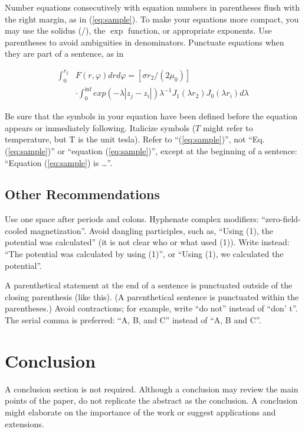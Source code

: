 \documentclass{ifacconf}
\begin{document}
Number equations consecutively with equation numbers in parentheses
flush with the right margin, as in (\ref{eq:sample}).  To make your equations more
compact, you may use the solidus ($/$), the $\exp$ function, or
appropriate exponents. Use parentheses to avoid ambiguities in
denominators. Punctuate equations when they are part of a sentence, as
in

\begin{equation} \label{eq:sample2}
\begin{array}{ll}
\int_0^{r_2} & F (r, \varphi ) dr d\varphi = [\sigma r_2 / (2 \mu_0 )] \\
& \cdot \int_0^{\inf} exp(-\lambda |z_j - z_i |) \lambda^{-1} J_1 (\lambda  r_2 ) J_0 (\lambda r_i ) d\lambda 
\end{array}
\end{equation}

Be sure that the symbols in your equation have been defined before the
equation appears or immediately following. Italicize symbols ($T$
might refer to temperature, but T is the unit tesla). Refer to
``(\ref{eq:sample})'', not ``Eq. (\ref{eq:sample})'' or ``equation
(\ref{eq:sample})'', except at the beginning of a sentence: ``Equation
(\ref{eq:sample}) is \ldots''.

\subsection{Other Recommendations}

Use one space after periods and colons. Hyphenate complex modifiers:
``zero-field-cooled magnetization''. Avoid dangling participles, such
as, ``Using (1), the potential was calculated'' (it is not clear who or
what used (1)). Write instead: ``The potential was calculated by using
(1)'', or ``Using (1), we calculated the potential''.

A parenthetical statement at the end of a sentence is punctuated
outside of the closing parenthesis (like this). (A parenthetical
sentence is punctuated within the parentheses.) Avoid contractions;
for example, write ``do not'' instead of ``don' t''. The serial comma
is preferred: ``A, B, and C'' instead of ``A, B and C''.


\section{Conclusion}

A conclusion section is not required. Although a conclusion may review
the main points of the paper, do not replicate the abstract as the
conclusion. A conclusion might elaborate on the importance of the work
or suggest applications and extensions.
\end{document}
